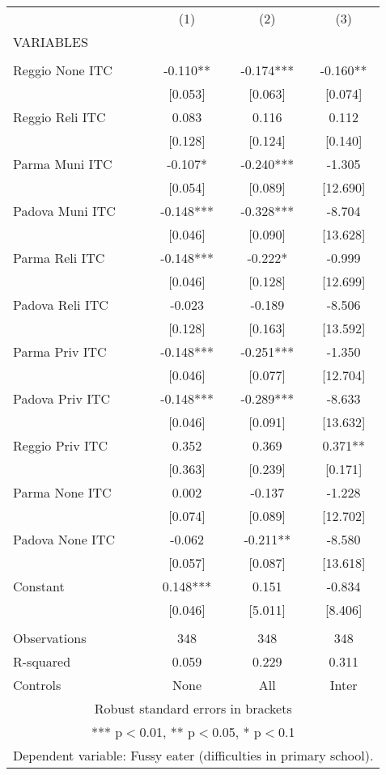 \begin{tabular}{lccc} \hline
 & (1) & (2) & (3) \\
VARIABLES &  &  &  \\ \hline
 &  &  &  \\
Reggio None ITC & -0.110** & -0.174*** & -0.160** \\
 & [0.053] & [0.063] & [0.074] \\
Reggio Reli ITC & 0.083 & 0.116 & 0.112 \\
 & [0.128] & [0.124] & [0.140] \\
Parma Muni ITC & -0.107* & -0.240*** & -1.305 \\
 & [0.054] & [0.089] & [12.690] \\
Padova Muni ITC & -0.148*** & -0.328*** & -8.704 \\
 & [0.046] & [0.090] & [13.628] \\
Parma Reli ITC & -0.148*** & -0.222* & -0.999 \\
 & [0.046] & [0.128] & [12.699] \\
Padova Reli ITC & -0.023 & -0.189 & -8.506 \\
 & [0.128] & [0.163] & [13.592] \\
Parma Priv ITC & -0.148*** & -0.251*** & -1.350 \\
 & [0.046] & [0.077] & [12.704] \\
Padova Priv ITC & -0.148*** & -0.289*** & -8.633 \\
 & [0.046] & [0.091] & [13.632] \\
Reggio Priv ITC & 0.352 & 0.369 & 0.371** \\
 & [0.363] & [0.239] & [0.171] \\
Parma None ITC & 0.002 & -0.137 & -1.228 \\
 & [0.074] & [0.089] & [12.702] \\
Padova None ITC & -0.062 & -0.211** & -8.580 \\
 & [0.057] & [0.087] & [13.618] \\
Constant & 0.148*** & 0.151 & -0.834 \\
 & [0.046] & [5.011] & [8.406] \\
 &  &  &  \\
Observations & 348 & 348 & 348 \\
R-squared & 0.059 & 0.229 & 0.311 \\
 Controls & None & All & Inter \\ \hline
\multicolumn{4}{c}{ Robust standard errors in brackets} \\
\multicolumn{4}{c}{ *** p$<$0.01, ** p$<$0.05, * p$<$0.1} \\
\multicolumn{4}{c}{ Dependent variable: Fussy eater (difficulties in primary school).} \\
\end{tabular}
